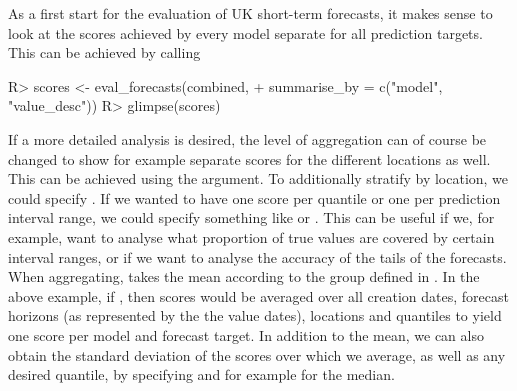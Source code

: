 \documentclass[article,shortnames]{jss}
\newcommand{\fct}[1]{\code{#1()}}
\begin{document}
As a first start for the evaluation of UK short-term forecasts, it makes sense to look at the scores achieved by every model separate for all prediction targets. This can be achieved by calling
\begin{Schunk}
\begin{Sinput}
R> scores <- eval_forecasts(combined, 
+                           summarise_by = c("model", "value_desc"))
R> glimpse(scores)
\end{Sinput}
\end{Schunk}
% 
If a more detailed analysis is desired, the level of aggregation can of course be changed to show for example separate scores for the different locations as well. This can be achieved using the  argument. To additionally stratify by location, we could specify . If we wanted to have one score per quantile or one per prediction interval range, we could specify something like  or . This can be useful if we, for example, want to analyse what proportion of true values are covered by certain interval ranges, or if we want to analyse the accuracy of the tails of the forecasts. When aggregating, \fct{eval\_forecasts} takes the mean according to the group defined in . In the above example, if , then scores would be averaged over all creation dates, forecast horizons (as represented by the the value dates), locations and quantiles to yield one score per model and forecast target. In addition to the mean, we can also obtain the standard deviation of the scores over which we average, as well as any desired quantile, by specifying  and for example  for the median. 
\end{document}
